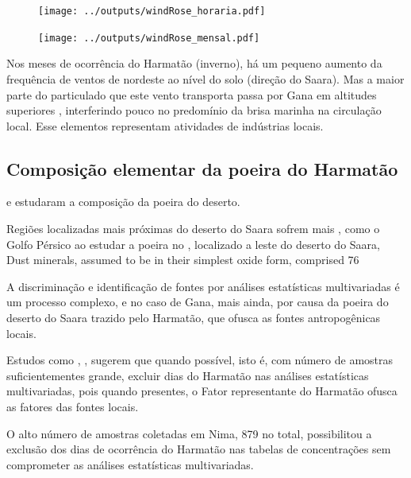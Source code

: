\begin{figure}[H]
  \centering
  \texttt{[image: ../outputs/windRose\_horaria.pdf]}
  \caption{ \citep{carslaw2012} \label{fig:windRose_horaria}}%
\end{figure}

\begin{figure}[H]
  \centering
  \texttt{[image: ../outputs/windRose\_mensal.pdf]}
  \caption{ \citep{carslaw2012} \label{fig:windRose_mensal}}
\end{figure}

Nos meses de ocorrência do Harmatão (inverno), há um pequeno aumento da frequência de ventos de nordeste ao nível do solo (direção do Saara). Mas a maior parte do particulado que este vento transporta passa por Gana 
em altitudes superiores \citep{breuning2005}, interferindo pouco no predomínio da brisa marinha na circulação local.%
%
Esse elementos representam atividades de indústrias locais. 

\newpage
\subsection{Composição elementar da poeira do Harmatão}

\cite{engelbrecht2009a} e \citep{engelbrecht2009b} estudaram a composição 
da poeira do deserto.

Regiões localizadas mais próximas do deserto do Saara sofrem mais 
, como o Golfo Pérsico
\citet{kaku2016} ao estudar a poeira no , localizado a leste do 
deserto do Saara,  
Dust minerals, assumed to be in
their simplest oxide form, comprised 76%


A discriminação e identificação de fontes por análises estatísticas 
multivariadas é um processo complexo, e no caso de Gana, mais ainda, 
por causa da poeira do deserto do Saara trazido pelo Harmatão, que ofusca 
as fontes antropogênicas locais.

Estudos como \citet{aboh2009}, \citet{ofosu2013}, \citet{ofosu2012} sugerem que
quando possível, isto é, com número de amostras suficientementes grande, excluir
dias do Harmatão nas análises estatísticas multivariadas, pois quando 
presentes, o Fator representante do Harmatão ofusca as fatores das fontes
locais.

O alto número de amostras coletadas em Nima, 879 no total, possibilitou a 
exclusão dos dias de ocorrência do Harmatão nas tabelas de concentrações 
sem comprometer as análises estatísticas multivariadas. 

